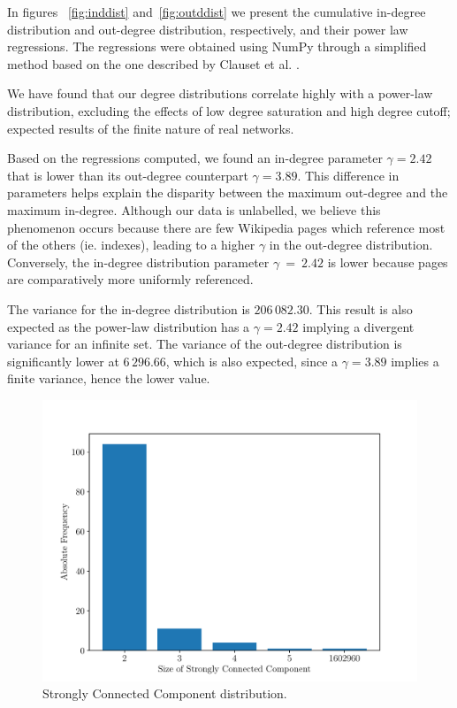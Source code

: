 \documentclass[9pt,a4paper,twocolumn]{article}
\begin{document}
In figures ~\ref{fig:inddist} and~\ref{fig:outddist} we present the cumulative in-degree distribution and out-degree distribution, respectively, and their power law regressions. The regressions were obtained using NumPy through a simplified method based on the one described by Clauset et al. \cite{Clauset2009}.

We have found that our degree distributions correlate highly with a power-law distribution, excluding the effects of low degree saturation and high degree cutoff; expected results of the finite nature of real networks.

Based on the regressions computed, we found an in-degree parameter $\gamma = 2.42$ that is lower than its out-degree counterpart $\gamma = 3.89$. This difference in parameters helps explain the disparity between the maximum out-degree and the maximum in-degree. Although our data is unlabelled, we believe this phenomenon occurs because there are few Wikipedia pages which reference most of the others (ie. indexes), leading to a higher $\gamma$ in the out-degree distribution. Conversely, the in-degree distribution parameter $\gamma~=~2.42$ is lower because pages are comparatively more uniformly referenced. %

The variance for the in-degree distribution is $206\,082.30$. This result is also expected as the power-law distribution has a $\gamma = 2.42$ implying a divergent variance for an infinite set. The variance of the out-degree distribution is significantly lower at $6\,296.66$, which is also expected, since a $ \gamma = 3.89 $ implies a finite variance, hence the lower value.

\begin{figure}[h]
	\centering
	\includegraphics[width=\linewidth]{wikipedia_pt_sccdistr.pdf}
	\caption{Strongly Connected Component distribution.}
	\label{fig:sccdist}
\end{figure}
\end{document}

